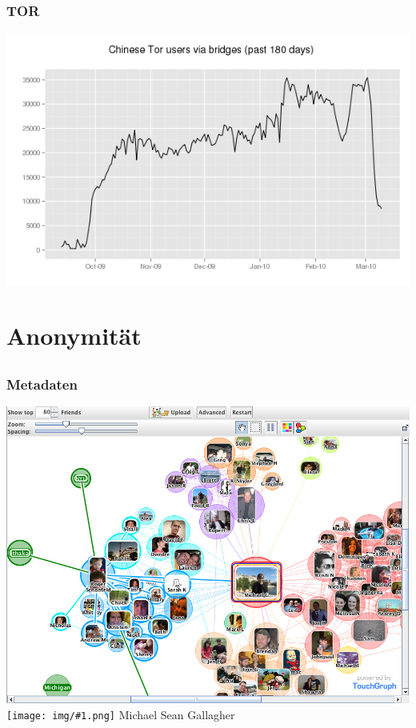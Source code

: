 \documentclass[12pt]{beamer}
\newcommand{\cc}[1]{\texttt{[image: img/\#1.png]}}
\begin{document}
\begin{frame}
    \frametitle{TOR}
    \includegraphics[height=0.7\textheight]{img/bridge2.png}
\end{frame}

\section{Anonymität}
\subsection{}

\begin{frame}
    \frametitle{Metadaten}
    \includegraphics[height=0.7\textheight]{img/socialgraph.jpg}
    \cc{by-sa} Michael Sean Gallagher
\end{frame}
\end{document}
